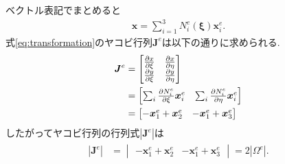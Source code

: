 \documentclass[paper=a4]{jlreq}
\begin{document}
ベクトル表記でまとめると
\begin{align}
    \bm{x} = \sum_{i=1}^3 N^e_i(\bm{\xi})\bm{x}^e_i. \label{eq:transformation}
\end{align}
式\eqref{eq:transformation}のヤコビ行列$\bm{J}^e$は以下の通りに求められる.
\begin{align}
    \begin{split}
        \bm{J}^e %
        &= 
        \begin{bmatrix}
            \pdv{x}{\xi} & \pdv{x}{\eta} \\
            \pdv{y}{\xi} & \pdv{y}{\eta} 
        \end{bmatrix}\\
        &=
        \begin{bmatrix}
            \sum_i\pdv{N^e_i}{\xi}\bm{x}^e_i & \sum_i\pdv{N^e_i}{\eta}\bm{x}^e_i
        \end{bmatrix} \\
        &=
        \begin{bmatrix}
            -\bm{x}^e_1+\bm{x}^e_2 & -\bm{x}^e_1+\bm{x}^e_3
        \end{bmatrix}
    \end{split}
\end{align}
したがってヤコビ行列の行列式$|\bm{J}^e|$は
\begin{align}
    \begin{split}
        |\bm{J}^e| &=
        \begin{vmatrix}
            -\bm{x}^e_1+\bm{x}^e_2 & -\bm{x}^e_1+\bm{x}^e_3
        \end{vmatrix} = 2|\Omega^e|.
        \label{eq:jacobian:determinant}
    \end{split}
\end{align}
\end{document}

